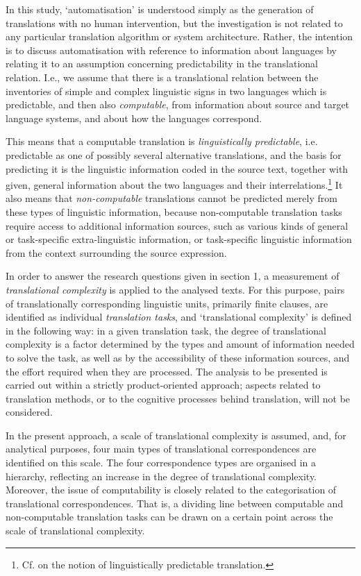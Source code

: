 \documentclass[output=paper]{LSP/langsci}
\begin{document}
In this study, `automatisation' is understood simply as the generation of translations with no human intervention, but the investigation is not related to any particular translation algorithm or system architecture. Rather, the intention is to discuss automatisation with reference to information about languages by relating it to an assumption concerning predictability in the translational relation. I.e., we assume that there is a translational relation between the inventories of simple and complex linguistic signs in two languages which is predictable, and then also \textit{computable}, from information about source and target language systems, and about how the languages correspond.

This means that a computable translation is \textit{linguistically predictable}, i.e. predictable as one of possibly several alternative translations, and the basis for predicting it is the linguistic information coded in the source text, together with given, general information about the two languages and their interrelations.\footnote{ Cf. \citet[52]{Dyvik1998} on the notion of linguistically predictable translation.} It also means that \textit{non-computable} translations cannot be predicted merely from these types of linguistic information, because non-computable translation tasks require access to additional information sources, such as various kinds of general or task-specific extra-linguistic information, or task-specific linguistic information from the context surrounding the source expression.

In order to answer the research questions given in section 1, a measurement of \textit{translational complexity} is applied to the analysed texts. For this purpose, pairs of translationally corresponding linguistic units, primarily finite clauses, are identified as individual \textit{translation tasks}, and `translational complexity' is defined in the following way: in a given translation task, the degree of translational complexity is a factor determined by the types and amount of information needed to solve the task, as well as by the accessibility of these information sources, and the effort required when they are processed. The analysis to be presented is carried out within a strictly product-oriented approach; aspects related to translation methods, or to the cognitive processes behind translation, will not be considered.

In the present approach, a scale of translational complexity is assumed, and, for analytical purposes, four main types of translational correspondences are identified on this scale. The four correspondence types are organised in a hierarchy, reflecting an increase in the degree of translational complexity. Moreover, the issue of computability is closely related to the categorisation of translational correspondences. That is, a dividing line between computable and non-computable translation tasks can be drawn on a certain point across the scale of translational complexity.
\end{document}
